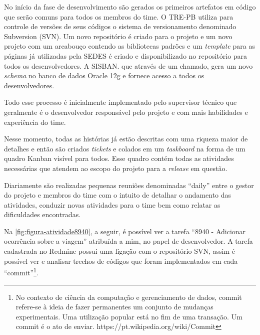 No início da fase de desenvolvimento são gerados os primeiros artefatos em código que serão comuns para todos os membros do time. O TRE-PB utiliza para controle de versões de seus códigos o sistema de versionamento denominado Subversion (SVN). Um novo repositório é criado para o projeto e um novo projeto com um arcabouço contendo as bibliotecas padrões e um \textit{template} para as páginas já utilizadas pela SEDES é criado e disponibilizado no repositório para todos os desenvolvedores. A SISBAN. que através de um chamado, gera um novo \textit{schema} no banco de dados Oracle 12g e fornece acesso a todos os desenvolvedores.

Todo esse processo é inicialmente implementado pelo supervisor técnico que geralmente é o desenvolvedor responsável pelo projeto e com mais habilidades e experiência do time.

Nesse momento, todas as histórias já estão descritas com uma riqueza maior de detalhes e então são criados \textit{tickets} e colados em um \textit{taskboard} na forma de um quadro Kanban visível para todos. Esse quadro contém todas as atividades necessárias que atendem ao escopo do projeto para a \textit{release} em questão. 

Diariamente são realizadas pequenas reuniões denominadas ``daily'' entre o gestor do projeto e membros do time com o intuito de detalhar o andamento das atividades, conduzir novas atividades para o time bem como relatar as dificuldades encontradas.

Na \autoref{fig:figura-atividade8940}, a seguir, é possível ver a tarefa ``8940 - Adicionar ocorrência sobre a viagem'' atribuída a mim, no papel de desenvolvedor. A tarefa cadastrada no Redmine possui uma ligação com o repositório SVN, assim é possível ver e analisar trechos de códigos que foram implementados em cada ``commit''\footnote{No contexto de ciência da computação e gerenciamento de dados, commit refere-se à ideia de fazer permanentes um conjunto de mudanças experimentais. Uma utilização popular está no fim de uma transação. Um commit é o ato de enviar. https://pt.wikipedia.org/wiki/Commit}.

